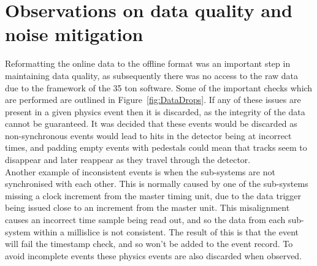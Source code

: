 \section{Observations on data quality and noise mitigation} \label{sec:AllTheNoise} %
Reformatting the online data to the offline format was an important step in maintaining data quality, as subsequently there was no access to the raw data due to the framework of the 35 ton software. Some of the important checks which are performed are outlined in Figure~\ref{fig:DataDrops}. If any of these issues are present in a given physics event then it is discarded, as the integrity of the data cannot be guaranteed. It was decided that these events would be discarded as non-synchronous events would lead to hits in the detector being at incorrect times, and padding empty events with pedestals could mean that tracks seem to disappear and later reappear as they travel through the detector. \\

Another example of inconsistent events is when the sub-systems are not synchronised with each other. This is normally caused by one of the sub-systems missing a clock increment from the master timing unit, due to the data trigger being issued close to an increment from the master unit. This misalignment causes an incorrect time sample being read out, and so the data from each sub-system within a millislice is not consistent. The result of this is that the event will fail the timestamp check, and so won't be added to the event record. To avoid incomplete events these physics events are also discarded when observed. \\

